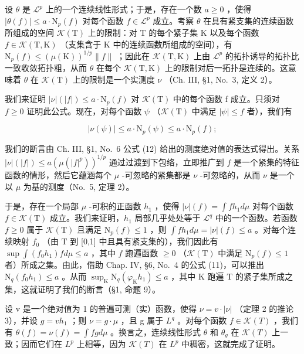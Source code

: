 设 \(\theta\) 是 \(\mathcal{L}^p\) 上的一个连续线性形式；于是，存在一个数 \(a \geqslant 0\) ，使得 \(|\theta(f)| \leqslant a \cdot \mathrm{N}_p(f)\) 对每个函数 \(f \in \mathcal{L}^p\) 成立。考察 \(\theta\) 在具有紧支集的连续函数所组成的空间 \(\mathcal{K}(\mathrm{T})\) 上的限制：对 T 的每个紧子集 K 以及每个函数 \(f \in \mathcal{K}(\mathrm{T}, \mathrm{K})\) （支集含于 K 中的连续函数所组成的空间），有 \(\mathrm{N}_p(f) \leqslant (\mu(\mathrm{K}))^{1/p} \| f \|\) ；因此在 \(\mathcal{K}(\mathrm{T}, \mathrm{K})\) 上由 \(\mathcal{L}^p\) 的拓扑诱导的拓扑比一致收敛拓扑粗，从而 \(\theta\) 在每个 \(\mathcal{K}(\mathrm{T}, \mathrm{K})\) 上的限制对后一拓扑是连续的。这意味着 \(\theta\) 在 \(\mathcal{K}(\mathrm{T})\) 上的限制是一个实测度 \(\nu\) （Ch. III, §1, No.~3, 定义 2）。

我们来证明 \(|\nu|(|f|) \leqslant a \cdot \mathrm{N}_{p}(f)\) 对 \(\mathcal{K}(\mathrm{T})\) 中的每个函数 f 成立。只须对 \(f \geqslant 0\) 证明此公式。现在，对每个函数 \(\psi\) （\(\mathcal{K}(\mathrm{T})\) 中满足 \(|\psi| \leqslant f\) 者），我们有

\[
| \nu (\psi) | \leqslant a \cdot \mathrm{N} _ {p} (\psi) \leqslant a \cdot \mathrm{N} _ {p} (f);
\]

我们的断言由 Ch. III, §1, No.~6 公式 (12) 给出的测度绝对值的表达式得出。关系 \(|\nu|(|f|) \leqslant a(\mu(|f|^p))^{1/p}\) 通过过渡到下包络，立即推广到 \(f\) 是一个紧集的特征函数的情形，然后它蕴涵每个 \(\mu\) -可忽略的紧集都是 \(\nu\) -可忽略的，从而 \(\nu\) 是一个以 \(\mu\) 为基的测度（No.~5, 定理 2）。

于是，存在一个局部 \(\mu\) -可积的正函数 \(h_1\) ，使得 \(|\nu|(f) = \int fh_1 d\mu\) 对每个函数 \(f \in \mathcal{K}(\mathrm{T})\) 成立。我们来证明，\(h_1\) 局部几乎处处等于 \(\mathcal{L}^q\) 中的一个函数。若函数 \(f \geqslant 0\) 属于 \(\mathcal{K}(\mathrm{T})\) 且满足 \(\mathrm{N}_p(f) \leqslant 1\) ，则 \(\int fh_1 d\mu = |\nu|(f) \leqslant a\) 。对每个连续映射 \(f_0\) （由 \(\mathrm{T}\) 到 {[}0,1{]} 中且具有紧支集的），我们因此有 \(\sup \int (f_0 h_1) f d\mu \leqslant a\) ，其中 \(f\) 跑遍函数 \(\geqslant 0\) （\(\mathcal{K}(\mathrm{T})\) 中满足 \(\mathrm{N}_p(f) \leqslant 1\) 者）所成之集。由此，借助 Chap. IV, §6, No.~4 的公式 (11)，可以推出 \(\mathrm{N}_q(f_0 h_1) \leqslant a\) 。从而 \(\sup_{\mathrm{K}} \mathrm{N}_q (\varphi_{\mathrm{K}} h_1) \leqslant a\) ，其中 \(\mathrm{K}\) 跑遍 \(\mathrm{T}\) 的紧子集所成之集，这就证明了我们的断言（§1, 命题 9）。

设 v 是一个绝对值为 1 的普遍可测（实）函数，使得 \(\nu = v \cdot |\nu|\) （定理 2 的推论 3），并设 \(g = v h_{1}\) ；则 \(\nu = g \cdot \mu\) ，且 g 属于 \(L^{q}\) 。对每个函数 \(f \in \mathcal{K}(T)\) ，我们有 \(\theta(f) = \nu(f) = \int fg d\mu\) 。换言之，连续线性形式 \(\theta\) 和 \(\theta_{g}\) 在 \(\mathcal{K}(T)\) 上一致；因而它们在 \(L^{p}\) 上相等，因为 \(\mathcal{K}(T)\) 在 \(L^{p}\) 中稠密，这就完成了证明。

